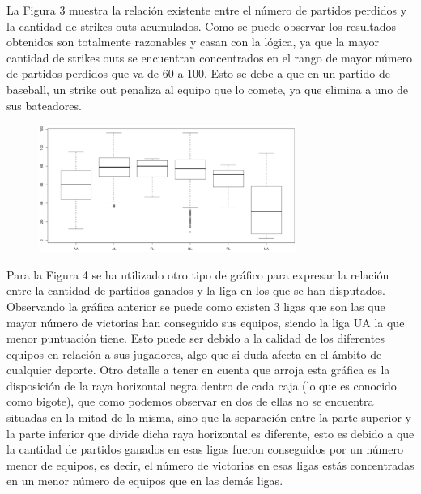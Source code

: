 \documentclass[10pt]{article}
\begin{document}
La Figura 3 muestra la relación existente entre el número de partidos perdidos y la cantidad de strikes outs acumulados. Como se puede observar los resultados obtenidos son totalmente razonables y casan con la lógica, ya que la mayor cantidad de strikes outs se encuentran concentrados en el rango de mayor número de partidos perdidos que va de 60 a 100. Esto se debe a que en un partido de baseball, un strike out penaliza al equipo que lo comete, ya que elimina a uno de sus bateadores. \\

\begin{figure}[H]
	\begin{center}
 		\includegraphics[width = 0.75\textwidth]{Imagenes/prepocesamiento3.eps}
	\end{center} 
\end{figure}

Para la Figura 4 se ha utilizado otro tipo de gráfico para expresar la relación entre la cantidad de partidos ganados y la liga en los que se han disputados. Observando la gráfica anterior se puede como existen 3 ligas que son las que mayor número de victorias han conseguido sus equipos, siendo la liga UA la que menor puntuación tiene. Esto puede ser debido a la calidad de los diferentes equipos en relación a sus jugadores, algo que si duda afecta en el ámbito de cualquier deporte. Otro detalle a tener en cuenta que arroja esta gráfica es la disposición de la raya horizontal negra dentro de cada caja (lo que es conocido como bigote), que como podemos observar en dos de ellas no se encuentra situadas en la mitad de la misma, sino que la separación entre la parte superior y la parte inferior que divide dicha raya horizontal es diferente, esto es debido a que la cantidad de partidos ganados en esas ligas fueron conseguidos por un número menor de equipos, es decir, el número de victorias en esas ligas estás concentradas en un menor número de equipos que en las demás ligas.
\end{document}
